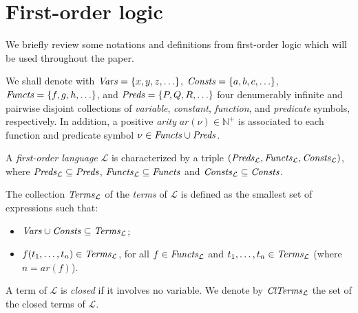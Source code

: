 \documentclass[a4paper]{llncs}
\newcommand{\Lang}{\ensuremath{\mathcal{L}\xspace}} %
\newcommand{\LangPreds}{\Preds_{\Lang}}
\newcommand{\LangFuncts}{\Functs_{\Lang}}
\newcommand{\LangConsts}{\Consts_{\Lang}}
\newcommand{\LangTerms}{\Terms_{\Lang}}
\newcommand{\LangClTerms}{\ClTerms_{\Lang}}
\newcommand{\ar}{\mathit{ar}}
\newcommand{\nat}{\mathbb{N}}
\begin{document}

\section{First-order logic}\label{PRELIMINARIES}


We briefly review some notations and definitions
from first-order logic which will be used throughout the
paper.

We shall denote with
$\mathit{Vars}=\{x, y, z, \ldots \}$, $\mathit{Consts}=\{a, b, c, \ldots \}$,
$\mathit{Functs}=\{f, g, h, \ldots \}$, and $\mathit{Preds}=\{P, Q, R, \ldots\}$
four denumerably infinite and pairwise disjoint collections
of \emph{variable}, \emph{constant}, \emph{function}, and \emph{predicate}
symbols, respectively.
In addition, a positive \emph{arity} $\ar(\nu) \in \nat^+$ is 
associated to each
function and predicate symbol $\nu \in \mathit{Functs} \cup \mathit{Preds}$.
%
%

A \emph{first-order language} $\Lang$ is characterized by
a triple $(\LangPreds, \LangFuncts, \LangConsts)$, where
$\LangPreds \subseteq \Preds$, $\LangFuncts \subseteq \Functs$ and
$\LangConsts \subseteq \Consts$.

The collection $\LangTerms$ of the \emph{terms} of $\Lang$ is
defined as the smallest set of expressions such that:
\begin{itemize}
\item $\Vars \cup \Consts \subseteq \LangTerms$;

\item $f(t_1, \ldots, t_n) \in \LangTerms$, for all $f \in 
\LangFuncts$ and $t_1, \ldots, t_n \in \LangTerms$ (where $n = \ar(f)$).
\end{itemize}
A term of $\Lang$ is \emph{closed} if it involves no variable. We 
denote by $\LangClTerms$ the set of the closed terms of $\Lang$.
\end{document}
